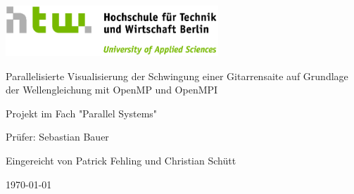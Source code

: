 \documentclass[12pt,a4paper,ngerman]{article}
\begin{document}
\begin{titlepage}
\thispagestyle{empty}

\begin{center}
	\includegraphics[width=0.6\textwidth]{pictures/HTW_Logo}
	
	\vspace{2cm}
	
	\Huge 
	Parallelisierte Visualisierung der Schwingung einer Gitarrensaite auf Grundlage der Wellengleichung mit OpenMP und OpenMPI
	
	\vspace{2cm}
	\large
	Projekt im Fach "Parallel Systems"
	
	\vspace{2cm}
	
	Prüfer: Sebastian Bauer
	
	\vspace{0.5cm}
	
	Eingereicht von Patrick Fehling und Christian Schütt
	
	\vspace{0.5cm}
	
	\today
\end{center}


\end{titlepage}

\pagestyle{empty}

\tableofcontents
\setcounter{page}{0}

\clearpage{}
\pagestyle{fancy}








\pagestyle{plain}



\end{document}
